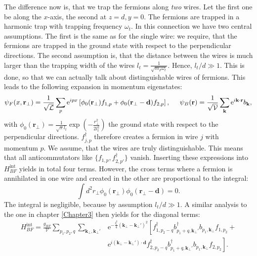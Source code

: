 The difference now is, that we trap the fermions along \textit{two} wires. Let the first one be along the $x$-axis, the second at $z=d, y=0$. The fermions are trapped in a harmonic trap with trapping frequency $\omega_t$. In this connection we have two central assumptions. The first is the same as for the single wire: we require, that the fermions are trapped in the ground state with respect to the perpendicular directions. The second assumption is, that the distance between the wires is much larger than the trapping width of the wires $l_t = \frac{1}{\sqrt{m_F\omega_t}}$. Hence, $l_t/d \gg 1$. This is done, so that we can actually talk about distinguishable wires of fermions. This leads to the following expansion in momentum eigenstates:
\begin{equation}
\psi_F(x,\mathbf{r}_\perp) = \frac{1}{\sqrt{\mathcal{L}}}\sum_p \text{e}^{ipx} \left[\phi_0(\mathbf{r}_\perp) f_{1,p} + \phi_0(\mathbf{r}_\perp-\mathbf{d}) f_{2,p}\right], \hspace{0.5cm} \psi_B(\mathbf{r}) = \frac{1}{\sqrt{\mathcal{V}}}\sum_{\mathbf{k}} \text{e}^{i\mathbf{k}\cdot \mathbf{r}} b_\mathbf{k}, 
\end{equation}  
with $\phi_0(\mathbf{r}_\perp) = \frac{1}{\sqrt{\pi}l_t}\exp\left(-\frac{r_\perp^2}{2l_t^2}\right)$ the ground state with respect to the perpendicular directions. $f^\dagger_{j,p}$ therefore creates a fermion in wire $j$ with momentum $p$. We assume, that the wires are truly distinguishable. This means that all anticommutators like $\{f_{1,p}, f^\dagger_{2,p'}\}$ vanish. Inserting these expressions into $H_{BF}^\text{int}$ yields in total four terms. However, the cross terms where a fermion is annihilated in one wire and created in the other are proportional to the integral:
\begin{equation}
\int d^2 r_\perp \phi_0(\mathbf{r}_\perp)\phi_0(\mathbf{r}_\perp-\mathbf{d}) = 0. 
\end{equation}
The integral is negligible, because by assumption $l_t/d \gg 1$. A similar analysis to the one in chapter \ref{Chapter3} then yields for the diagonal terms:
\begin{align}
H_{BF}^\text{int} = \frac{g_{BF}}{\mathcal{V}}\sum_{p_1,p_2,q} \sum_{\mathbf{k}_\perp, \mathbf{k}_\perp'} & \text{e}^{-\frac{l_t^2}{4}(\mathbf{k}_\perp - \mathbf{k}_\perp')^2}\left[ f^\dagger_{1,p_2-q} b^\dagger_{p_1+q, \mathbf{k}_\perp'} b_{p_1,\mathbf{k}_\perp}f_{1,p_2} + \right. \nonumber \\
& \left. \text{e}^{i(\mathbf{k}_\perp - \mathbf{k}_\perp')\cdot \mathbf{d}}f_{2,p_2-q}^\dagger b_{p_1+q, \mathbf{k}_\perp'}^\dagger b_{p_1,\mathbf{k}_\perp}f_{2,p_2} \right].
\end{align}

